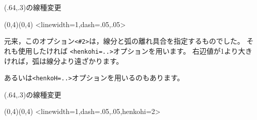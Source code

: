 \documentclass[a4j]{jarticle}
\begin{document}
\begin{showEx}(.64,.3){の線種変更}
\begin{pszahyou*}[ul=10mm](0,4)(0,4)
  \HenKo<linewidth=1,dash={.05,.05}>\A{}
  \Drawline{\A\B}
\end{pszahyou*}
\end{showEx}

元来，このオプション\verb+<#2>+は，線分と弧の離れ具合を指定するものでした。
それも使用したければ \verb+<henkohi=..>+オプションを用います。
右辺値が1より大きければ，弧は線分より遠ざかります。

あるいは\verb+<henkoH=..>+オプションを用いるのもあります。

\begin{showEx}(.64,.3){の線種変更}
\begin{pszahyou*}[ul=10mm](0,4)(0,4)
  \HenKo<linewidth=1,dash={.05,.05},henkohi=2>%
      \A{}
  \Drawline{\A\B}
\end{pszahyou*}
\end{showEx}
\end{document}
